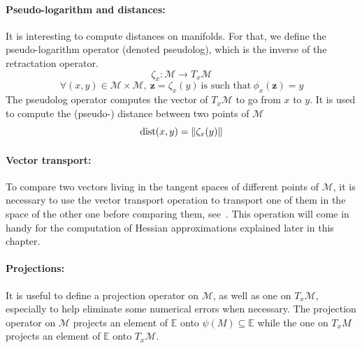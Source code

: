 \paragraph{Pseudo-logarithm and distances:}
It is interesting to compute distances on manifolds.
For that, we define the pseudo-logarithm operator (denoted pseudolog), which is the inverse of the retractation operator.
\begin{equation*}
  \zeta_x:\mathcal{M}\rightarrow T_x\mathcal{M}
\end{equation*}
\begin{equation*}
  \forall (x,y)\in \mathcal{M}\times\mathcal{M},\ \mathbf{z}=\zeta_x(y)\ \text{is such that}\ \phi_x(\mathbf{z}) = y
\end{equation*}
The pseudolog operator computes the vector of $T_x\mathcal{M}$ to go from $x$ to $y$.
It is used to compute the (pseudo-) distance between two points of $\mathcal{M}$
\begin{equation*}
  \operatorname{dist}(x,y) = \|\zeta_x(y)\|
\end{equation*}

\paragraph{Vector transport:}
To compare two vectors living in the tangent spaces of different points of $\mathcal{M}$, it is necessary to use the vector transport operation to transport one of them in the space of the other one before comparing them, see~.
This operation will come in handy for the computation of Hessian approximations explained later in this chapter.


\paragraph{Projections:} It is useful to define a projection operator on $\mathcal{M}$, as well as one on $T_x\mathcal{M}$, especially to help eliminate some numerical errors when necessary.
The projection operator on $\mathcal{M}$ projects an element of $\mathbb{E}$ onto $\psi(M)\subseteq \mathbb{E}$ while the one on $T_x{M}$ projects an element of $\mathbb{E}$ onto $T_x\mathcal{M}$.

